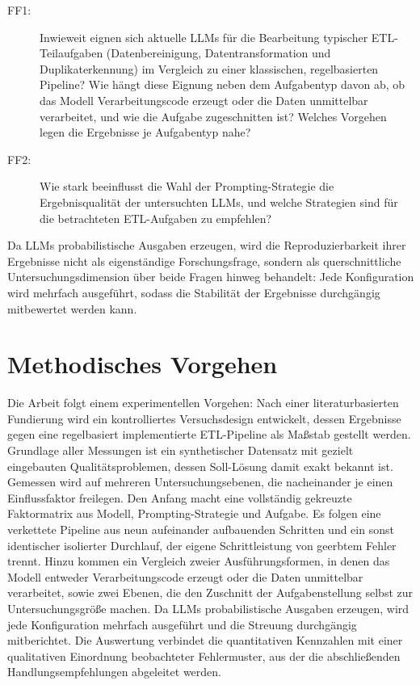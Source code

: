 \begin{description}
    \item[FF1:] Inwieweit eignen sich aktuelle \acp{LLM} für die Bearbeitung typischer \ac{ETL}-Teilaufgaben (Datenbereinigung, Datentransformation und Duplikaterkennung) im Vergleich zu einer klassischen, regelbasierten Pipeline? Wie hängt diese Eignung neben dem Aufgabentyp davon ab, ob das Modell Verarbeitungscode erzeugt oder die Daten unmittelbar verarbeitet, und wie die Aufgabe zugeschnitten ist? Welches Vorgehen legen die Ergebnisse je Aufgabentyp nahe?
    \item[FF2:] Wie stark beeinflusst die Wahl der Prompting-Strategie die Ergebnisqualität der untersuchten \acp{LLM}, und welche Strategien sind für die betrachteten \ac{ETL}-Aufgaben zu empfehlen?
\end{description}

Da \acp{LLM} probabilistische Ausgaben erzeugen, wird die Reproduzierbarkeit ihrer Ergebnisse nicht als eigenständige Forschungsfrage, sondern als querschnittliche Untersuchungsdimension über beide Fragen hinweg behandelt: Jede Konfiguration wird mehrfach ausgeführt, sodass die Stabilität der Ergebnisse durchgängig mitbewertet werden kann.

\section{Methodisches Vorgehen}
\label{sec:methodik}

Die Arbeit folgt einem experimentellen Vorgehen: Nach einer literaturbasierten Fundierung wird ein kontrolliertes Versuchsdesign entwickelt, dessen Ergebnisse gegen eine regelbasiert implementierte \ac{ETL}-Pipeline als Maßstab gestellt werden. Grundlage aller Messungen ist ein synthetischer Datensatz mit gezielt eingebauten Qualitätsproblemen, dessen Soll-Lösung damit exakt bekannt ist. Gemessen wird auf mehreren Untersuchungsebenen, die nacheinander je einen Einflussfaktor freilegen. Den Anfang macht eine vollständig gekreuzte Faktormatrix aus Modell, Prompting-Strategie und Aufgabe. Es folgen eine verkettete Pipeline aus neun aufeinander aufbauenden Schritten und ein sonst identischer isolierter Durchlauf, der eigene Schrittleistung von geerbtem Fehler trennt. Hinzu kommen ein Vergleich zweier Ausführungsformen, in denen das Modell entweder Verarbeitungscode erzeugt oder die Daten unmittelbar verarbeitet, sowie zwei Ebenen, die den Zuschnitt der Aufgabenstellung selbst zur Untersuchungsgröße machen. Da \acp{LLM} probabilistische Ausgaben erzeugen, wird jede Konfiguration mehrfach ausgeführt und die Streuung durchgängig mitberichtet. Die Auswertung verbindet die quantitativen Kennzahlen mit einer qualitativen Einordnung beobachteter Fehlermuster, aus der die abschließenden Handlungsempfehlungen abgeleitet werden.


